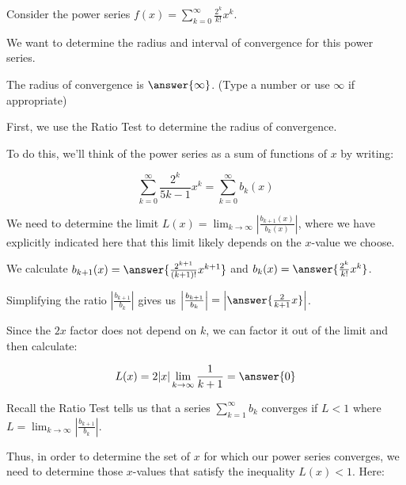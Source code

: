 \documentclass{ximera}
\author{Jim Talamo}
\begin{document}
\begin{exercise}
Consider the power series $f(x) = \sum_{k=0}^{\infty} \frac{2^k}{k!}x^k$.

We want to determine the radius and interval of convergence for this power series. 

The radius of convergence is $\answer{\infty}$.
(Type a number or use $\infty$ if appropriate)

\begin{hint}
First, we use the Ratio Test to determine the radius of convergence. 

To do this, we'll think of the power series as a sum of functions of $x$ by writing: 

\[
\sum_{k=0}^{\infty} \frac{2^k}{5k-1}x^{k} = \sum_{k=0}^{\infty} b_k(x)
\]

We need to determine the limit $L(x) = \lim_{k \to \infty} \left| \frac{b_{k+1}(x)}{b_k(x)}\right|$, where we have explicitly indicated here that this limit likely depends on the $x$-value we choose. 

We calculate $b_{k+1}(x)=\answer{\frac{2^{k+1}}{(k+1)!}x^{k+1}}$ and $b_k(x)=\answer{ \frac{2^k}{k!}x^k}$. 

\begin{question}

Simplifying the ratio $\left|\frac{b_{k+1}}{b_k}\right|$ gives us $\left|\frac{b_{k+1}}{b_k}\right|=\left|\answer{\frac{2}{k+1} x} \right|$.


\begin{question}

Since the $2x$ factor does not depend on $k$, we can factor it out of the limit and then calculate:

\[
L(x) = 2|x| \lim_{k \to \infty}   \frac{1}{k+1}  =\answer{ 0}
\]

\begin{question}

Recall the Ratio Test tells us that a series $\sum^{\infty}_{k=1} b_k$ converges if $L <1$ where $L=\lim_{k \to \infty}\left| \frac{b_{k+1}}{b_k}\right|$. 

Thus, in order to determine the set of $x$ for which our power series converges, we need to determine those $x$-values that satisfy the inequality $L(x) <1$. Here:

\begin{multipleChoice}
\end{multipleChoice}


\end{question}
\end{question}
\end{question}
\end{hint}
\end{exercise}
\end{document}
